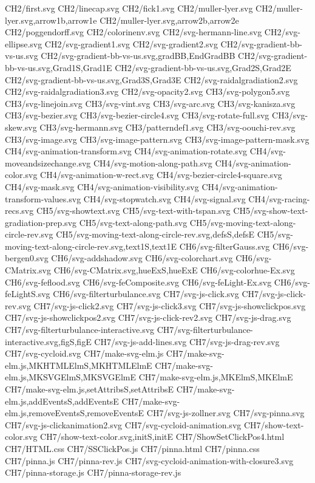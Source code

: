 CH2/first.svg
CH2/linecap.svg
CH2/fick1.svg
CH2/muller-lyer.svg
CH2/muller-lyer.svg,arrow1b,arrow1e
CH2/muller-lyer.svg,arrow2b,arrow2e
CH2/poggendorff.svg
CH2/colorinenv.svg
CH2/svg-hermann-line.svg
CH2/svg-ellipse.svg
CH2/svg-gradient1.svg
CH2/svg-gradient2.svg
CH2/svg-gradient-bb-vs-us.svg
CH2/svg-gradient-bb-vs-us.svg,gradBB,EndGradBB
CH2/svg-gradient-bb-vs-us.svg,Grad1S,Grad1E
CH2/svg-gradient-bb-vs-us.svg,Grad2S,Grad2E
CH2/svg-gradient-bb-vs-us.svg,Grad3S,Grad3E
CH2/svg-raidalgradiation2.svg
CH2/svg-raidalgradiation3.svg
CH2/svg-opacity2.svg
CH3/svg-polygon5.svg
CH3/svg-linejoin.svg
CH3/svg-vint.svg
CH3/svg-arc.svg
CH3/svg-kanisza.svg
CH3/svg-bezier.svg
CH3/svg-bezier-circle4.svg
CH3/svg-rotate-full.svg
CH3/svg-skew.svg
CH3/svg-hermann.svg
CH3/patterndef1.svg
CH3/svg-oouchi-rev.svg
CH3/svg-image.svg
CH3/svg-image-pattern.svg
CH3/svg-image-pattern-mask.svg
CH4/svg-animation-transform.svg
CH4/svg-animation-rotate.svg
CH4/svg-moveandsizechange.svg
CH4/svg-motion-along-path.svg
CH4/svg-animation-color.svg
CH4/svg-animation-w-rect.svg
CH4/svg-bezier-circle4-square.svg
CH4/svg-mask.svg
CH4/svg-animation-visibility.svg
CH4/svg-animation-transform-values.svg
CH4/svg-stopwatch.svg
CH4/svg-signal.svg
CH4/svg-racing-recs.svg
CH5/svg-showtext.svg
CH5/svg-text-with-tspan.svg
CH5/svg-show-text-gradiation-prep.svg
CH5/svg-text-along-path.svg
CH5/svg-moving-text-along-circle-rev.svg
CH5/svg-moving-text-along-circle-rev.svg,defsS,defsE
CH5/svg-moving-text-along-circle-rev.svg,text1S,text1E
CH6/svg-filterGauss.svg
CH6/svg-bergen0.svg
CH6/svg-addshadow.svg
CH6/svg-colorchart.svg
CH6/svg-CMatrix.svg
CH6/svg-CMatrix.svg,hueExS,hueExE
CH6/svg-colorhue-Ex.svg
CH6/svg-feflood.svg
CH6/svg-feComposite.svg
CH6/svg-feLight-Ex.svg
CH6/svg-feLightS.svg
CH6/svg-filterturbulance.svg
CH7/svg-js-click.svg
CH7/svg-js-click-rev.svg
CH7/svg-js-click2.svg
CH7/svg-js-click3.svg
CH7/svg-js-showclickpos.svg
CH7/svg-js-showclickpos2.svg
CH7/svg-js-click-rev2.svg
CH7/svg-js-drag.svg
CH7/svg-filterturbulance-interactive.svg
CH7/svg-filterturbulance-interactive.svg,figS,figE
CH7/svg-js-add-lines.svg
CH7/svg-js-drag-rev.svg
CH7/svg-cycloid.svg
CH7/make-svg-elm.js
CH7/make-svg-elm.js,MKHTMLElmS,MKHTMLElmE
CH7/make-svg-elm.js,MKSVGElmS,MKSVGElmE
CH7/make-svg-elm.js,MKElmS,MKElmE
CH7/make-svg-elm.js,setAttribsS,setAttribsE
CH7/make-svg-elm.js,addEventsS,addEventsE
CH7/make-svg-elm.js,removeEventsS,removeEventsE
CH7/svg-js-zollner.svg
CH7/svg-pinna.svg
CH7/svg-js-clickanimation2.svg
CH7/svg-cycloid-animation.svg
CH7/show-text-color.svg
CH7/show-text-color.svg,initS,initE
CH7/ShowSetClickPos4.html
CH7/HTML.css
CH7/SSClickPos.js
CH7/pinna.html
CH7/pinna.css
CH7/pinna.js
CH7/pinna-rev.js
CH7/svg-cycloid-animation-with-closure3.svg
CH7/pinna-storage.js
CH7/pinna-storage-rev.js
